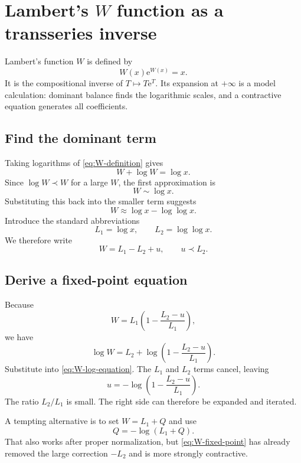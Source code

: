 \documentclass[11pt,openany]{book}
\theoremstyle{definition}
\theoremstyle{plain}
\theoremstyle{remark}
\newcommand{\e}{\mathrm{e}}
\newcommand{\asym}{\sim}
\newcommand{\precdom}{\prec}
\begin{document}
\chapter{Lambert's \texorpdfstring{$W$}{W} function as a transseries inverse}\label{ch:lambertW}

Lambert's function $W$ is defined by
\begin{equation}\label{eq:W-definition}
 W(x)\e^{W(x)}=x.
\end{equation}
It is the compositional inverse of $T\mapsto T\e^T$. Its expansion at $+\infty$ is a model calculation: dominant balance finds the logarithmic scales, and a contractive equation generates all coefficients.

\section{Find the dominant term}

Taking logarithms of \cref{eq:W-definition} gives
\begin{equation}\label{eq:W-log-equation}
 W+\log W=\log x.
\end{equation}
Since $\log W\precdom W$ for a large $W$, the first approximation is
\[
 W\asym\log x.
\]
Substituting this back into the smaller term suggests
\[
 W\approx\log x-\log\log x.
\]
Introduce the standard abbreviations
\begin{equation}\label{eq:L1L2}
 L_1=\log x,
 \qquad
 L_2=\log\log x.
\end{equation}
We therefore write
\begin{equation}\label{eq:W-u-ansatz}
 W=L_1-L_2+u,
 \qquad u\precdom L_2.
\end{equation}

\section{Derive a fixed-point equation}

Because
\[
 W=L_1\left(1-\frac{L_2-u}{L_1}\right),
\]
we have
\[
 \log W=L_2+
 \log\left(1-\frac{L_2-u}{L_1}\right).
\]
Substitute into \cref{eq:W-log-equation}. The $L_1$ and $L_2$ terms cancel, leaving
\begin{equation}\label{eq:W-fixed-point}
 u=-\log\left(1-\frac{L_2-u}{L_1}\right).
\end{equation}
The ratio $L_2/L_1$ is small. The right side can therefore be expanded and iterated.

A tempting alternative is to set $W=L_1+Q$ and use
\[
 Q=-\log(L_1+Q).
\]
That also works after proper normalization, but \cref{eq:W-fixed-point} has already removed the large correction $-L_2$ and is more strongly contractive.
\end{document}
